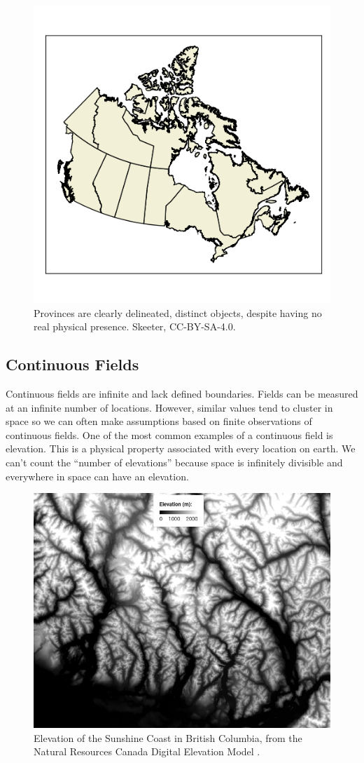 \documentclass[
]{book}
\begin{document}
\begin{figure}
\includegraphics[width=0.75\linewidth]{images/03-vector} \caption{Provinces are clearly delineated, distinct objects, despite having no real physical presence. Skeeter, CC-BY-SA-4.0.}\label{fig:3-vector}
\end{figure}

\subsection{Continuous Fields}\label{continuous-fields}

Continuous fields are infinite and lack defined boundaries. Fields can be measured at an infinite number of locations. However, similar values tend to cluster in space so we can often make assumptions based on finite observations of continuous fields. One of the most common examples of a continuous field is elevation. This is a physical property associated with every location on earth. We can't count the ``number of elevations'' because space is infinitely divisible and everywhere in space can have an elevation.



\begin{figure}
\includegraphics[width=0.75\linewidth]{images/03-elevation} \caption{Elevation of the Sunshine Coast in British Columbia, from the Natural Resources Canada Digital Elevation Model \citep{nrcan_canadian_2021}.}\label{fig:3-elevation}
\end{figure}
\end{document}
